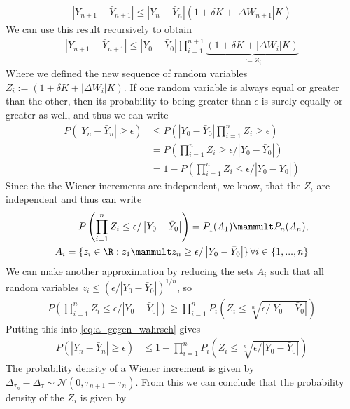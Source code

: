 \begin{align}
\left|Y_{n+1}-\bar{Y}_{n+1}\right|\leq \left|Y_n-\bar{Y}_{n}\right|(1+\delta K+|\Delta W_{n+1}|K)
\end{align}
We can use this result recursively to obtain
\begin{align}
\left|Y_{n+1}-\bar{Y}_{n+1}\right|\leq \left|Y_0-\bar{Y}_{0}\right|\prod_{i=1}^{n+1}\underbrace{(1+\delta K+|\Delta W_{i}|K)}_{:=Z_i}
\end{align}
Where we defined the new sequence of random variables $Z_i :=(1+\delta K+|\Delta W_{i}|K) $. If one random variable is always equal or greater than the other, then its probability to being greater than $\epsilon$ is surely equally or greater as well, and thus we can write
\begin{align}
P(\left|Y_{n}-\bar{Y}_{n}\right|\geq \epsilon)&\leq P\left(\left|Y_0-\bar{Y}_0\right|\prod_{i=1}^n Z_i \geq \epsilon\right)\\
& = P\left(\prod_{i=1}^n Z_i \geq \epsilon/\left|Y_0-\bar{Y}_0\right|\right)\\
& = 1 - P\left(\prod_{i=1}^n Z_i \leq \epsilon/\left|Y_0-\bar{Y}_0\right|\right)\label{eq:a_gegen_wahrsch}
\end{align}
Since the the Wiener increments are independent, we know, that the $Z_i$ are independent and thus can write
\begin{align}
P\left(\prod_{i=1}^n Z_i \leq \epsilon/\left|Y_0-\bar{Y}_0\right|\right) = P_1(A_1)\manmult P_n(A_n), \\
A_i = \{z_i\in\R:z_1\manmult z_n \geq \epsilon/\left|Y_0-\bar{Y}_0\right|\}\, \forall i \in \{1,...,n\}
\end{align}
We can make another approximation by reducing the sets $A_i$ such that all random variables $z_i\leq (\epsilon/\left|Y_0-\bar{Y}_0\right|)^{1/n}$, so
\begin{align}
P\left(\prod_{i=1}^n Z_i \leq \epsilon/\left|Y_0-\bar{Y}_0\right|\right)  \geq \prod_{i=1}^n P_i\left(Z_i\leq \sqrt[n]{ \epsilon/\left|Y_0-\bar{Y}_0\right|}\right)
\end{align}
Putting this into \cref{eq:a_gegen_wahrsch} gives
\begin{align}
P(\left|Y_{n}-\bar{Y}_{n}\right|\geq \epsilon)&\leq 1 - \prod_{i=1}^n P_i\left(Z_i\leq \sqrt[n]{ \epsilon/\left|Y_0-\bar{Y}_0\right|}\right) \label{eq:a_absch_gegen_wahrsch}
\end{align}
The probability density of a Wiener increment is given by $\Delta_{\tau_n} - \Delta_\tau \sim  \mathcal{N}(0,\tau_{n+1}-\tau_n)$. From this we can conclude that the probability density of the $Z_i$ is given by 
